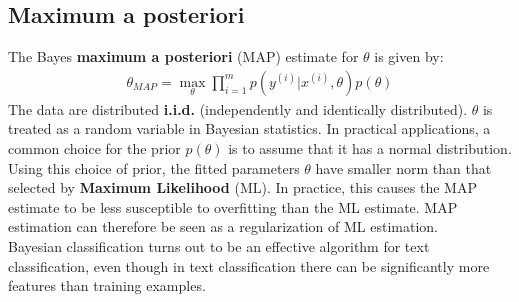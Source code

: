 \documentclass{report}
\begin{document}
\subsection{Maximum a posteriori}
The Bayes {\bf maximum a posteriori} (MAP) estimate for $\theta$ is given by:
\begin{align*}
\theta_{MAP}=\max\limits_{\theta} \prod_{i=1}^m p(y^{(i)}\vert x^{(i)},\theta)p(\theta)
\end{align*}
The data are distributed {\bf i.i.d.} (independently and identically distributed). $\theta$ is treated as a random variable in Bayesian statistics.
In practical applications, a common choice for the prior $p(\theta)$ is to assume that it has a normal distribution.
Using this choice of prior, the fitted parameters $\theta$ have smaller norm than that selected by {\bf Maximum Likelihood} (ML).
In practice, this causes the MAP estimate to be less susceptible to overfitting than the ML estimate. MAP estimation can therefore be seen as a regularization of ML estimation.
\\
Bayesian classification turns out to be an effective algorithm for text classification, even though in text classification there can be significantly more features than training examples.
\end{document}
